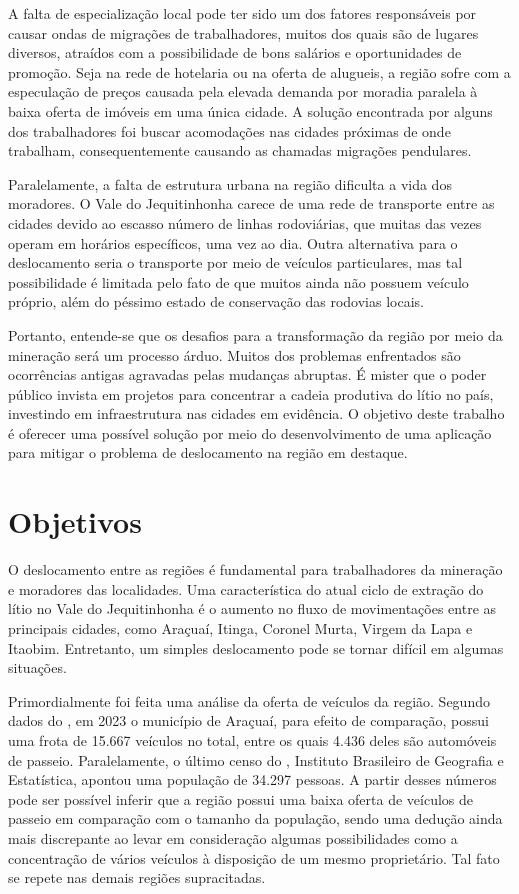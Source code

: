 A falta de especialização local pode ter sido um dos fatores responsáveis por causar ondas de migrações de trabalhadores, muitos dos quais são de lugares diversos, atraídos com a possibilidade de bons salários e oportunidades de promoção. Seja na rede de hotelaria ou na oferta de alugueis, a região sofre com a especulação de preços causada pela elevada demanda por moradia paralela à baixa oferta de imóveis em uma única cidade. A solução encontrada por alguns dos trabalhadores foi buscar acomodações nas cidades próximas de onde trabalham, consequentemente causando as chamadas migrações pendulares.

Paralelamente, a falta de estrutura urbana na região dificulta a vida dos moradores. O Vale do Jequitinhonha carece de uma rede de transporte entre as cidades devido ao escasso número de linhas rodoviárias, que muitas das vezes operam em horários específicos, uma vez ao dia. Outra alternativa para o deslocamento seria o transporte por meio de veículos particulares, mas tal possibilidade é limitada pelo fato de que muitos ainda não possuem veículo próprio, além do péssimo estado de conservação das rodovias locais.

Portanto, entende-se que os desafios para a transformação da região por meio da mineração será um processo árduo. Muitos dos problemas enfrentados são ocorrências antigas agravadas pelas mudanças abruptas. É mister que o poder público invista em projetos para concentrar a cadeia produtiva do lítio no país, investindo em infraestrutura nas cidades em evidência. O objetivo deste trabalho é oferecer uma possível solução por meio do desenvolvimento de uma aplicação para mitigar o problema de deslocamento na região em destaque.

\section{Objetivos}

O deslocamento entre as regiões é fundamental para trabalhadores da mineração e moradores das localidades. Uma característica do atual ciclo de extração do lítio no Vale do Jequitinhonha é o aumento no fluxo de movimentações entre as principais cidades, como Araçuaí, Itinga, Coronel Murta, Virgem da Lapa e Itaobim. Entretanto, um simples deslocamento pode se tornar difícil em algumas situações.

Primordialmente foi feita uma análise da oferta de veículos da região. Segundo dados do , em 2023 o município de Araçuaí, para efeito de comparação, possui uma frota de 15.667 veículos no total, entre os quais 4.436 deles são automóveis de passeio. Paralelamente, o último censo do , Instituto Brasileiro de Geografia e Estatística, apontou uma população de 34.297 pessoas. A partir desses números pode ser possível inferir que a região possui uma baixa oferta de veículos de passeio em comparação com o tamanho da população, sendo uma dedução ainda mais discrepante ao levar em consideração algumas possibilidades como a concentração de vários veículos à disposição de um mesmo proprietário. Tal fato se repete nas demais regiões supracitadas.

